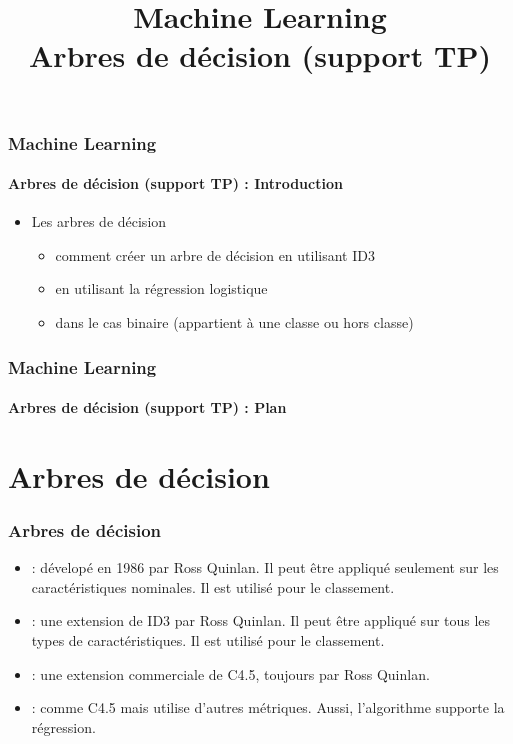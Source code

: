 \documentclass[xcolor=table]{beamer}
\title[ML : Arbres de décision (TP)] %
{Machine Learning \\Arbres de décision (support TP)}
\begin{document}
	
\begin{frame}
	\frametitle{Machine Learning}
	\framesubtitle{Arbres de décision (support TP) : Introduction}
	
	\begin{itemize}
		\item Les arbres de décision
		\begin{itemize}
			\item comment créer un arbre de décision en utilisant ID3
			\item en utilisant la régression logistique
			\item dans le cas binaire (appartient à une classe ou hors classe)
		\end{itemize}
	\end{itemize}
\end{frame}


\begin{frame}
	\frametitle{Machine Learning}
	\framesubtitle{Arbres de décision (support TP) : Plan}
	
	\begin{multicols}{2}
		\tableofcontents
	\end{multicols}
\end{frame}

\section{Arbres de décision}

\begin{frame}
	\frametitle{Arbres de décision}
	
	\begin{itemize}
		\item {} : dévelopé en 1986 par Ross Quinlan. Il peut être appliqué seulement sur les caractéristiques nominales. Il est utilisé pour le classement.
		\item {} : une extension de ID3 par Ross Quinlan. Il peut être appliqué sur tous les types de caractéristiques. Il est utilisé pour le classement.
		\item {} : une extension commerciale de C4.5, toujours par Ross Quinlan.
		\item {} : comme C4.5 mais utilise d'autres métriques. Aussi, l'algorithme supporte la régression.
	\end{itemize}
	
\end{frame}
\end{document}
